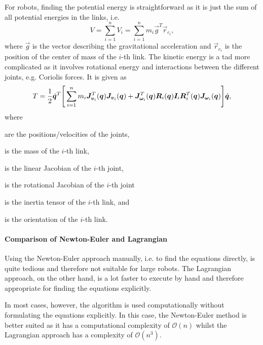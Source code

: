 					For robots, finding the potential energy is straightforward as it is just the sum of all potential energies in the links, i.e.
					\begin{equation*}
						V = \sum_{i = 1}^{n} V_i = \sum_{i = 1}^{n} m_i \vec{g}^T \vec{r}_{c_i},
					\end{equation*}
					where \(\vec{g}\) is the vector describing the gravitational acceleration and \(\vec{r}_{c_i}\) is the position of the center of mass of the \(i\)-th link. The kinetic energy is a tad more complicated as it involves rotational energy and interactions between the different joints, e.g. Coriolis forces. It is given as
					\begin{equation*}
						T = \frac{1}{2} \dot{\bm{q}}^T \Bigg[ \sum_{i = 1}^{n} m_i \bm{J}_{\bm{v}_i}^T(\bm{q}) \bm{J}_{\bm{v}_i}(\bm{q}) + \bm{J}_{\bm{\omega}_i}^T(\bm{q}) \bm{R}_i(\bm{q}) \bm{I}_i \bm{R}_i^T(\bm{q}) \bm{J}_{\bm{\omega}_i}(\bm{q}) \Bigg] \dot{\bm{q}},
					\end{equation*}
					where
					\begin{description}[leftmargin=2cm]
						\item[\(\vec{q}\)/\(\dot{\vec{q}}\)] are the positions/velocities of the joints,
						\item[\(m_i\)] is the mass of the \(i\)-th link,
						\item[\(\mat{J}_{\vec{v}_i}\)] is the linear Jacobian of the \(i\)-th joint,
						\item[\(\mat{J}_{\vec{\omega}_i}\)] is the rotational Jacobian of the \(i\)-th joint
						\item[\(\mat{I}_i\)] is the inertia tensor of the \(i\)-th link, and
						\item[\(\mat{R}_i(\vec{q})\)] is the orientation of the \(i\)-th link.
					\end{description}

				\paragraph{Comparison of Newton-Euler and Lagrangian}
					Using the Newton-Euler approach manually, i.e. to find the equations directly, is quite tedious and therefore not suitable for large robots. The Lagrangian approach, on the other hand, is a lot faster to execute by hand and therefore appropriate for finding the equations explicitly.

					In most cases, however, the algorithm is used computationally without formulating the equations explicitly. In this case, the Newton-Euler method is better suited as it has a computational complexity of \( \mathcal{O}(n) \) whilst the Lagrangian approach has a complexity of \( \mathcal{O}(n^3) \).

